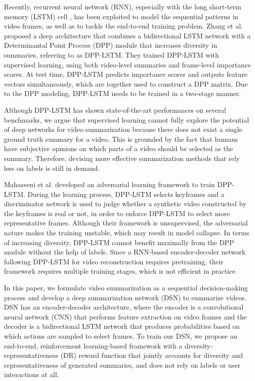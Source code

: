 \documentclass[letterpaper]{article} \usepackage{aaai18}  \usepackage{times}  \usepackage{helvet}  \usepackage{courier}  \usepackage{url}  \usepackage{graphicx}
\begin{document}
Recently, recurrent neural network (RNN), especially with the long short-term memory (LSTM) cell \cite{hochreiter1997long}, has been exploited to model the sequential patterns in video frames, as well as to tackle the end-to-end training problem. Zhang et al. \cite{zhang2016video} proposed a deep architecture that combines a bidirectional LSTM network with a Determinantal Point Process (DPP) module that increases diversity in summaries, referring to as DPP-LSTM. They trained DPP-LSTM with supervised learning, using both video-level summaries and frame-level importance scores. At test time, DPP-LSTM predicts importance scores and outputs feature vectors simultaneously, which are together used to construct a DPP matrix. Due to the DPP modeling, DPP-LSTM needs to be trained in a two-stage manner.

Although DPP-LSTM \cite{zhang2016video} has shown state-of-the-art performances on several benchmarks, we argue that supervised learning cannot fully explore the potential of deep networks for video summarization because there does not exist a single ground truth summary for a video. This is grounded by the fact that humans have subjective opinions on which parts of a video should be selected as the summary. Therefore, devising more effective summarization methods that rely less on labels is still in demand.

Mahasseni et al. \cite{mahasseniunsupervised} developed an adversarial learning framework to train DPP-LSTM. During the learning process, DPP-LSTM selects keyframes and a discriminator network is used to judge whether a synthetic video constructed by the keyframes is real or not, in order to enforce DPP-LSTM to select more representative frames. Although their framework is unsupervised, the adversarial nature makes the training unstable, which may result in model collapse. In terms of increasing diversity, DPP-LSTM cannot benefit maximally from the DPP module without the help of labels. Since a RNN-based encoder-decoder network following DPP-LSTM for video reconstruction requires pretraining, their framework requires multiple training stages, which is not efficient in practice.

In this paper, we formulate video summarization as a sequential decision-making process and develop a deep summarization network (DSN) to summarize videos. DSN has an encoder-decoder architecture, where the encoder is a convolutional neural network (CNN) that performs feature extraction on video frames and the decoder is a bidirectional LSTM network that produces probabilities based on which actions are sampled to select frames. To train our DSN, we propose an end-to-end, reinforcement learning-based framework with a diversity-representativeness (DR) reward function that jointly accounts for diversity and representativeness of generated summaries, and does not rely on labels or user interactions at all.
\end{document}

